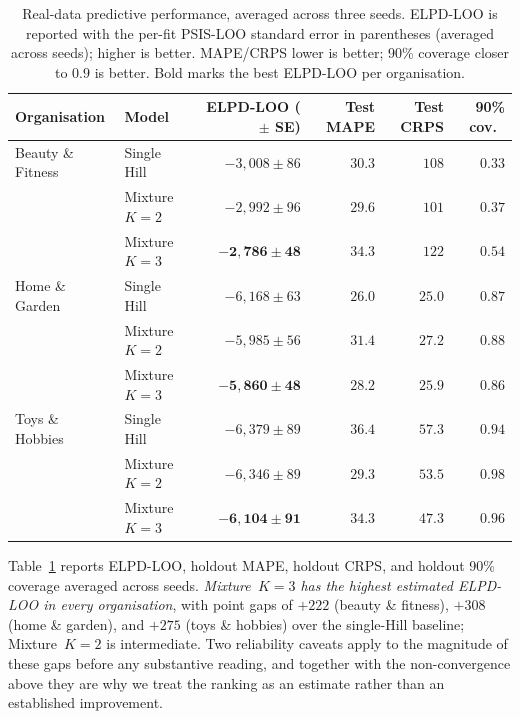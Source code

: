 \documentclass[11pt]{article}
\begin{document}
\begin{table}[ht]
\centering
\caption{Real-data predictive performance, averaged across three seeds. ELPD-LOO is reported with the per-fit PSIS-LOO standard error in parentheses (averaged across seeds); higher is better. MAPE/CRPS lower is better; 90\% coverage closer to $0.9$ is better. Bold marks the best ELPD-LOO per organisation.}
\label{tab:real_predictive}
\begin{tabular}{llrrrr}
\toprule
Organisation & Model & ELPD-LOO ($\pm$ SE) & Test MAPE & Test CRPS & 90\% cov.\ \\
\midrule
Beauty \& Fitness  & Single Hill    & $-3{,}008 \pm 86$ & $30.3$ & $108$  & $0.33$ \\
                   & Mixture $K=2$ & $-2{,}992 \pm 96$ & $29.6$ & $101$  & $0.37$ \\
                   & Mixture $K=3$ & $\mathbf{-2{,}786 \pm 48}$ & $34.3$ & $122$ & $0.54$ \\
\addlinespace
Home \& Garden     & Single Hill    & $-6{,}168 \pm 63$ & $26.0$ & $25.0$ & $0.87$ \\
                   & Mixture $K=2$ & $-5{,}985 \pm 56$ & $31.4$ & $27.2$ & $0.88$ \\
                   & Mixture $K=3$ & $\mathbf{-5{,}860 \pm 48}$ & $28.2$ & $25.9$ & $0.86$ \\
\addlinespace
Toys \& Hobbies    & Single Hill    & $-6{,}379 \pm 89$ & $36.4$ & $57.3$ & $0.94$ \\
                   & Mixture $K=2$ & $-6{,}346 \pm 89$ & $29.3$ & $53.5$ & $0.98$ \\
                   & Mixture $K=3$ & $\mathbf{-6{,}104 \pm 91}$ & $34.3$ & $47.3$ & $0.96$ \\
\bottomrule
\end{tabular}
\end{table}

Table~\ref{tab:real_predictive} reports ELPD-LOO, holdout MAPE, holdout CRPS, and holdout 90\% coverage averaged across seeds. \emph{Mixture~$K=3$ has the highest estimated ELPD-LOO in every organisation}, with point gaps of $+222$ (beauty \& fitness), $+308$ (home \& garden), and $+275$ (toys \& hobbies) over the single-Hill baseline; Mixture~$K=2$ is intermediate. Two reliability caveats apply to the magnitude of these gaps before any substantive reading, and together with the non-convergence above they are why we treat the ranking as an estimate rather than an established improvement.
\end{document}
